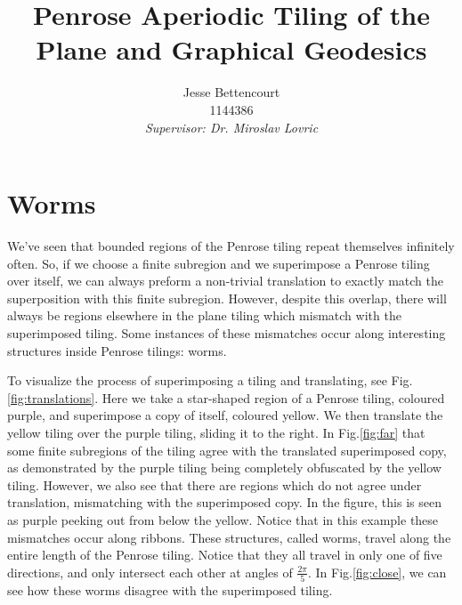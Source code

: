 \documentclass[
  oneside,
  11pt, a4paper,
  footinclude=true,
  headinclude=true,
  cleardoublepage=empty
]{scrbook}
\title{Penrose Aperiodic Tiling of the Plane and Graphical Geodesics}
\author{Jesse Bettencourt\\1144386\\[80pt]  \textit{Supervisor: Dr. Miroslav Lovric}}
\begin{document}
\section{Worms} 

We've seen that bounded regions of the Penrose tiling repeat themselves infinitely often. So, if we choose a finite subregion and we superimpose a Penrose tiling over itself, we can always preform a non-trivial translation to exactly match the superposition with this finite subregion. However, despite this overlap, there will always be regions elsewhere in the plane tiling which mismatch with the superimposed tiling. Some instances of these mismatches occur along interesting structures inside Penrose tilings: worms.

To visualize the process of superimposing a tiling and translating, see Fig.\ref{fig:translations}. Here we take a star-shaped region of a Penrose tiling, coloured purple, and superimpose a copy of itself, coloured yellow. We then translate the yellow tiling over the purple tiling, sliding it to the right. In Fig.\ref{fig:far} that some finite subregions of the tiling agree with the translated superimposed copy, as demonstrated by the purple tiling being completely obfuscated by the yellow tiling. However, we also see that there are regions which do not agree under translation, mismatching with the superimposed copy. In the figure, this is seen as purple peeking out from below the yellow. Notice that in this example these mismatches occur along ribbons. These structures, called worms, travel along the entire length of the Penrose tiling. Notice that they all travel in only one of five directions, and only intersect each other at angles of $\frac{2\pi}{5}$. In Fig.\ref{fig:close}, we can see how these worms disagree with the superimposed tiling.
\end{document}

